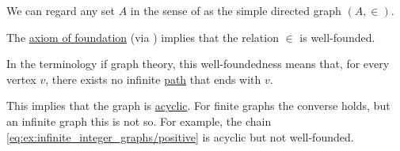 \begin{remark}\label{rem:well_founded_graphs}
  We can regard any set \( A \) in the sense of \hyperref[def:zfc]{} as the simple directed graph \( (A, \in) \).

  The \hyperref[def:zfc/foundation]{axiom of foundation} (via ) implies that the relation \( \in \) is well-founded.

  In the terminology if graph theory, this well-foundedness means that, for every vertex \( v \), there exists no infinite \hyperref[def:quiver_path]{path} that ends with \( v \).

  This implies that the graph is \hyperref[def:undirected_multigraph_path]{acyclic}. For finite graphs the converse holds, but an infinite graph this is not so. For example, the chain \eqref{eq:ex:infinite_integer_graphs/positive} is acyclic but not well-founded.
\end{remark}

